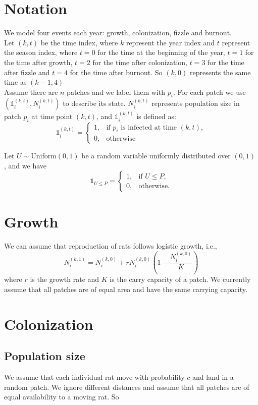 \documentclass[12pt]{article}
\begin{document}
\section{Notation}
We model four events each year: growth, colonization, fizzle and burnout. \\

Let $(k,t)$ be the time index, where $k$ represent the year index and $t$ represent the season index, where $t=0$ for the time at the beginning of the year, $t=1$ for the time after growth, $t=2$ for the time after colonization, $t=3$ for the time after fizzle and $t=4$ for the time after burnout. So $(k,0)$ represents the same time as $(k-1,4)$\\

Assume there are $n$ patches and we label them with $p_i$. For each patch we use $(\mathds{1}_i^{(k,t)},N_i^{(k,t)})$ to describe its state. $N_i^{(k,t)}$ represents population size in patch $p_i$ at time point $(k,t)$, and $\mathds{1}_i^{(k,t)}$ is defined as:
$$
\mathds{1}_i^{(k,t)} =
\begin{cases}
1, & \text{if $p_i$ is infected at time $(k,t)$}, \\
0, & \text{otherwise} 
\end{cases}
$$

Let $U \sim \text{Uniform}(0, 1)$ be a random variable uniformly distributed over $(0,1)$ , and we have
$$
\mathds{1}_{U \leq P} =
\begin{cases}
1, & \text{if } U \leq P, \\
0, & \text{otherwise.}
\end{cases}
$$

\section{Growth}
We can assume that reproduction of rats follows logistic growth, i.e.,
$$N_i^{(k,1)}=N_i^{(k,0)}+rN_i^{(k,0)}(1-\frac{N_i^{(k,0)}}{K})$$
where $r$ is the growth rate and $K$ is the carry capacity of a patch. We currently assume that all patches are of equal area and have the same carrying capacity.

\section{Colonization}
\subsection{Population size}
We assume that each individual rat move with probability $c$ and land in a random patch. We ignore different distances and assume that all patches are of equal availability to a moving rat. So 
\end{document}

